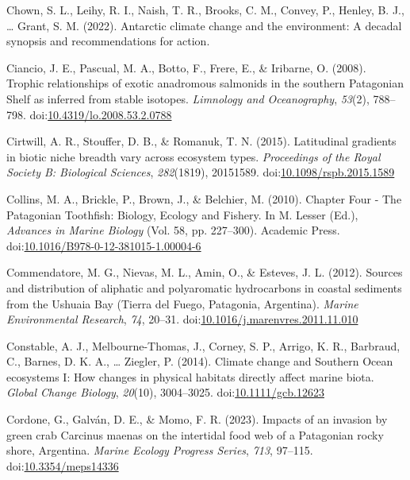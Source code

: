 \documentclass[
]{article}
\newlength{\cslhangindent}
\newenvironment{CSLReferences}[2] %
 {\begin{list}{}{%
  \setlength{\itemindent}{0pt}
  \setlength{\leftmargin}{0pt}
  \setlength{\parsep}{0pt}
  \ifodd #1
   \setlength{\leftmargin}{\cslhangindent}
   \setlength{\itemindent}{-1\cslhangindent}
  \fi
  \setlength{\itemsep}{#2\baselineskip}}}
 {\end{list}}
\begin{document}
\begin{CSLReferences}{1}{0}
Chown, S. L., Leihy, R. I., Naish, T. R., Brooks, C. M., Convey, P.,
Henley, B. J., \ldots{} Grant, S. M. (2022). Antarctic climate change
and the environment: A decadal synopsis and recommendations for action.

Ciancio, J. E., Pascual, M. A., Botto, F., Frere, E., \& Iribarne, O.
(2008). Trophic relationships of exotic anadromous salmonids in the
southern {Patagonian Shelf} as inferred from stable isotopes.
\emph{Limnology and Oceanography}, \emph{53}(2), 788--798.
doi:\href{https://doi.org/10.4319/lo.2008.53.2.0788}{10.4319/lo.2008.53.2.0788}

Cirtwill, A. R., Stouffer, D. B., \& Romanuk, T. N. (2015). Latitudinal
gradients in biotic niche breadth vary across ecosystem types.
\emph{Proceedings of the Royal Society B: Biological Sciences},
\emph{282}(1819), 20151589.
doi:\href{https://doi.org/10.1098/rspb.2015.1589}{10.1098/rspb.2015.1589}

Collins, M. A., Brickle, P., Brown, J., \& Belchier, M. (2010). Chapter
{Four} - {The Patagonian Toothfish}: {Biology}, {Ecology} and {Fishery}.
In M. Lesser (Ed.), \emph{Advances in {Marine Biology}} (Vol. 58, pp.
227--300). {Academic Press}.
doi:\href{https://doi.org/10.1016/B978-0-12-381015-1.00004-6}{10.1016/B978-0-12-381015-1.00004-6}

Commendatore, M. G., Nievas, M. L., Amin, O., \& Esteves, J. L. (2012).
Sources and distribution of aliphatic and polyaromatic hydrocarbons in
coastal sediments from the {Ushuaia Bay} ({Tierra} del {Fuego},
{Patagonia}, {Argentina}). \emph{Marine Environmental Research},
\emph{74}, 20--31.
doi:\href{https://doi.org/10.1016/j.marenvres.2011.11.010}{10.1016/j.marenvres.2011.11.010}

Constable, A. J., Melbourne-Thomas, J., Corney, S. P., Arrigo, K. R.,
Barbraud, C., Barnes, D. K. A., \ldots{} Ziegler, P. (2014). Climate
change and {Southern Ocean} ecosystems {I}: How changes in physical
habitats directly affect marine biota. \emph{Global Change Biology},
\emph{20}(10), 3004--3025.
doi:\href{https://doi.org/10.1111/gcb.12623}{10.1111/gcb.12623}

Cordone, G., Galván, D. E., \& Momo, F. R. (2023). Impacts of an
invasion by green crab {Carcinus} maenas on the intertidal food web of a
{Patagonian} rocky shore, {Argentina}. \emph{Marine Ecology Progress
Series}, \emph{713}, 97--115.
doi:\href{https://doi.org/10.3354/meps14336}{10.3354/meps14336}


\end{CSLReferences}
\end{document}
